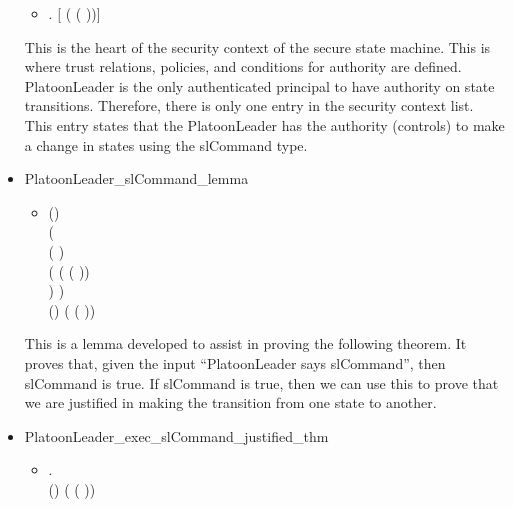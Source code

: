 \begin{itemize}
\begin{itemize}
    \item[] \HOLTokenTurnstile{} \HOLSymConst{\HOLTokenForall{}}.
       \HOLSymConst{=}
     [    ( ( ))]
   \end{itemize}
   This is the heart of the security context of the secure state machine. This is
   where trust relations, policies, and conditions for authority are defined.
   PlatoonLeader is the only authenticated principal to have authority on state
   transitions. Therefore, there is only one entry in the security context list.
   This entry states that the PlatoonLeader has the authority (controls) to make a
   change in states using the slCommand type.
 \item PlatoonLeader_slCommand_lemma
   \begin{itemize}
    \item[] \HOLTokenTurnstile{}  (\HOLSymConst{,}\HOLSymConst{,})\\
     \tab(   \\\tab\tab( )\\
        \tab\tab(    ( ( ))\HOLSymConst{::}\\\tab\tab\tab{}) 
        ) \HOLSymConst{\HOLTokenImp{}}\\
   (\HOLSymConst{,}\HOLSymConst{,})   ( ( ))
 \end{itemize}
 This is a lemma developed to assist in proving the following theorem. It proves that,
 given the input “PlatoonLeader says slCommand”, then slCommand is true. If slCommand is
 true, then we can use this to prove that we are justified in making the transition
 from one state to another.
\item PlatoonLeader_exec_slCommand_justified_thm
  \begin{itemize}
    \item[] \HOLTokenTurnstile{} \HOLSymConst{\HOLTokenForall{}}    .
     \\ (\HOLSymConst{,}\HOLSymConst{,}) ( ( ))

\end{itemize}
\end{itemize}
